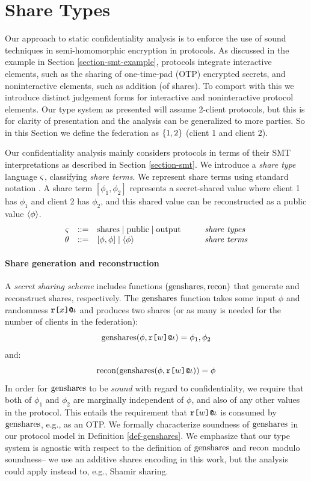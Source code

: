 \section{Share Types}
\label{section-sty}

Our approach to static confidentiality analysis is to enforce the use
of sound techniques in semi-homomorphic encryption in protocols.  As
discussed in the example in Section \ref{section-smt-example},
protocols integrate interactive elements, such as the sharing of
one-time-pad (OTP) encrypted secrets, and noninteractive elements,
such as addition (of shares). To comport with this we introduce
distinct judgement forms for interactive and noninteractive protocol
elements. Our type system as presented will assume 2-client protocols,
but this is for clarity of presentation and the analysis can be
generalized to more parties.  So in this Section we define the
federation as $\{ 1,2 \}$ (client 1 and client 2).

Our confidentiality analysis mainly considers protocols in terms of
their SMT interpretations as described in Section \ref{section-smt}.
We introduce a \emph{share type} language $\varsigma$, classifying
\emph{share terms}. We represent share terms using standard notation
\cite{10.1007/978-3-030-68869-1_3}. A share term $[\phi_1,\phi_2]$
represents a secret-shared value where client 1 has $\phi_1$ and
client 2 has $\phi_2$, and this shared value can be reconstructed
as a public value $\langle \phi \rangle$.
$$
\begin{array}{rcl@{\hspace{10mm}}l}
  \sty &::=& \sharety \mid \pubty \mid \outty & \textit{share types} \\
  \stt &::=& [\phi,\phi] \mid \pubx{\phi} & \textit{share terms} 
\end{array}
$$
\paragraph{Share generation and reconstruction}
A \emph{secret sharing scheme} includes functions
$(\mathrm{genshares},\mathrm{recon})$ that generate and reconstruct shares,
respectively. The $\mathrm{genshares}$ function takes some
input $\phi$ and randomness $\texttt{r[}x\texttt{]}\texttt{@}\iota$ and produces
two shares (or as many is needed for the number of clients
in the federation): 
$$
\mathrm{genshares}(\phi,\texttt{r[}w\texttt{]}\texttt{@}\iota) = \phi_1,\phi_2
$$
and:
$$
\mathrm{recon}(\mathrm{genshares}(\phi,\texttt{r[}w\texttt{]}\texttt{@}\iota)) = \phi
$$
In order for $\mathrm{genshares}$ to be \emph{sound} with regard to
confidentiality, we require
that both of $\phi_1$ and $\phi_2$ are marginally independent
of $\phi$, and also of any other values in the protocol.
This entails the requirement that $\texttt{r[}w\texttt{]}\texttt{@}\iota$ is
consumed by $\mathrm{genshares}$, e.g., as an OTP.
We formally characterize soundness of $\mathrm{genshares}$
in our protocol model in Definition \ref{def-genshares}.
We emphasize that our type system is agnostic with respect
to the definition of $\mathrm{genshares}$ and $\mathrm{recon}$ modulo
soundness-- we use an additive shares encoding in this work,
but the analysis could apply instead to, e.g., Shamir
sharing.

